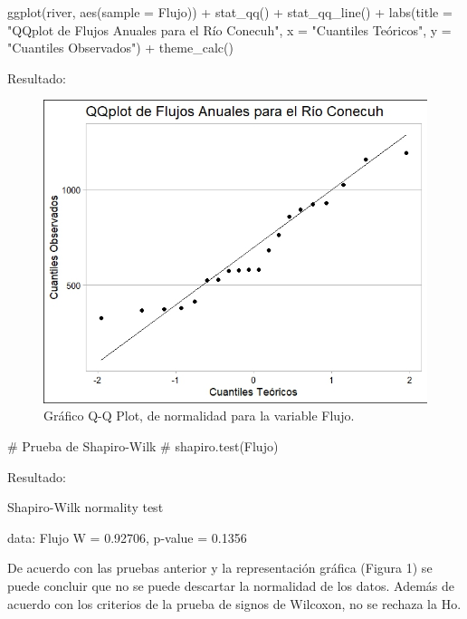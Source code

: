 \documentclass[a4paper,12pt]{article} %
\begin{document}
\begin{enumerate} [label=\textbf{\alph*})]
\begin{MyVerbatim}
ggplot(river, aes(sample = Flujo)) +
stat_qq() +
stat_qq_line() +
labs(title = "QQplot de Flujos Anuales para el Río Conecuh",
x = "Cuantiles Teóricos",
y = "Cuantiles Observados") +
theme_calc()
\end{MyVerbatim}
Resultado:
\begin{figure}[H]
	\centering
	\includegraphics[width=0.7\linewidth]{qqplot}
	\captionsetup{labelfont=bf}
	\caption[qqplot]{Gráfico Q-Q Plot, de normalidad para la variable Flujo.}
	\label{fig: Gráfico qqplot, de normalidad para la variable Flujo}
\end{figure}
\begin{MyVerbatim}
	# Prueba de Shapiro-Wilk  #
shapiro.test(Flujo)
\end{MyVerbatim}
Resultado:
\begin{MyVerbatim}
	
	Shapiro-Wilk normality test
	
data:  Flujo
W = 0.92706, p-value = 0.1356
\end{MyVerbatim}
De acuerdo con las pruebas anterior y la representación gráfica (Figura 1) se puede concluir que no se puede descartar la normalidad de los datos. Además de acuerdo con los criterios de la prueba de signos de Wilcoxon, no se rechaza la Ho.
		\end{enumerate}
		
		\clearpage
\end{document}
